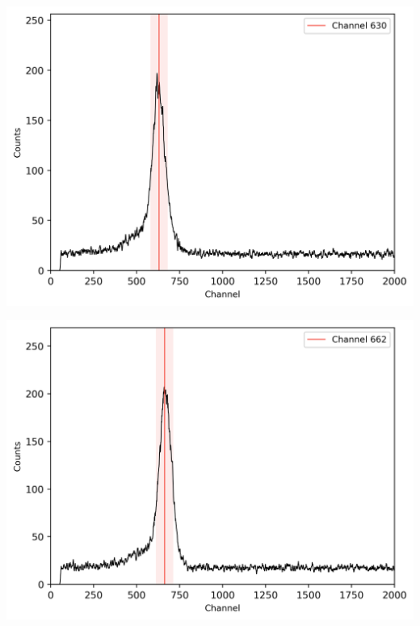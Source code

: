 \begin{multicols}{2}
\begin{center}
\begin{adjustbox}{max width=\linewidth, keepaspectratio}
        \end{adjustbox}
        \label{fig:137Cskoinz2}
    \end{center}
\endminipage
%
\vspace{10mm}
%
\minipage{\linewidth}
    \begin{center}
        \captionsetup{type=figure}
        \begin{adjustbox}{max width=\linewidth, keepaspectratio}
            \includegraphics[]{png/137CsTPHC}
        \end{adjustbox}
        \label{fig:137CsTPHC}
    \end{center}
\endminipage
%
\vspace{10mm}
%
\minipage{\linewidth}
    \begin{center}
        \captionsetup{type=figure}
        \begin{adjustbox}{max width=\linewidth, keepaspectratio}
            \includegraphics[]{png/137CsTPHC20ns}

\end{adjustbox}
\end{center}
\end{multicols}
